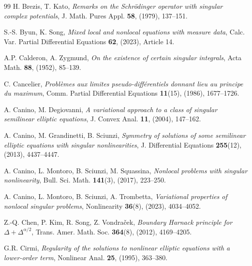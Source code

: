\documentclass[11pt,a4paper]{amsart}
\theoremstyle{definition}
\theoremstyle{plain}
\numberwithin{equation}{section}
\begin{document}
{\begin{thebibliography}{99}
H. Brezis, T. Kato, 
{\em Remarks on the Schr\"{o}dinger operator with singular complex potentials}, 
J. Math. Pures Appl. {\bf 58}, (1979), 137--151.

S.-S. Byun, K. Song, 
{\em Mixed local and nonlocal equations with measure data},
Calc. Var. Partial Differential Equations  {\bf 62}, (2023), Article 14.


A.P. Calderon, A. Zygmund, 
{\em On the existence of certain singular integrals}, 
Acta Math. {\bf 88}, (1952), 85--139.


C. Cancelier, 
{\em Problèmes aux limites pseudo-différentiels donnant lieu au principe du maximum},
Comm. Partial Differential Equations {\bf 11}(15), (1986), 1677--1726.

 A. Canino, M. Degiovanni, 
 {\em A variational approach to a class of singular semilinear elliptic equations},
J. Convex Anal. {\bf 11}, (2004), 147--162.

A. Canino, M. Grandinetti, B. Sciunzi,
{\em Symmetry of solutions of some semilinear elliptic equations with singular nonlinearities},
J. Differential Equations {\bf 255}(12), (2013), 4437--4447.
 
A. Canino, L. Montoro, B. Sciunzi, M. Squassina, 
{\em Nonlocal problems with singular nonlinearity},
Bull. Sci. Math. {\bf 141}(3), (2017), 223--250. 

A. Canino, L. Montoro, B. Sciunzi, A. Trombetta,
{\em Variational properties of nonlocal singular problems},
Nonlinearity {\bf 36}(8), (2023), 4034--4052.
 
 

 Z.-Q. Chen, P. Kim, R. Song, Z. Vondra\v{c}ek, 
 {\em Boundary Harnack principle for $\Delta + \Delta^{\alpha/2}$}, 
 Trans. Amer. Math. Soc. {\bf 364}(8), (2012), 4169--4205. 

G.R. Cirmi,
{\em Regularity of the solutions to nonlinear elliptic equations with a lower-order term},
Nonlinear Anal. {\bf 25}, (1995), 363--380.



\end{thebibliography}}
\end{document}
